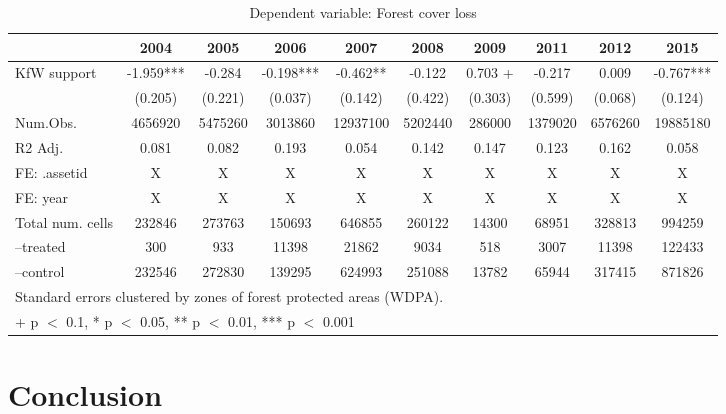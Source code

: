 \documentclass{article}
\begin{document}
\begin{table}[H]
\caption{Dependent variable: Forest cover loss}
\begin{minipage}{0.1\textwidth}

\centering
\begin{tabular}[t]{lccccccccc}
\toprule
  & 2004 & 2005 & 2006 & 2007 & 2008 & 2009 & 2011 & 2012 & 2015\\
\midrule
KfW support & -1.959*** & -0.284 & -0.198*** & -0.462** & -0.122 & 0.703 + & -0.217 & 0.009 & -0.767***\\
 & (0.205) & (0.221) & (0.037) & (0.142) & (0.422) & (0.303) & (0.599) & (0.068) & (0.124)\\
\midrule
Num.Obs. & 4656920 & 5475260 & 3013860 & 12937100 & 5202440 & 286000 & 1379020 & 6576260 & 19885180\\
R2 Adj. & 0.081 & 0.082 & 0.193 & 0.054 & 0.142 & 0.147 & 0.123 & 0.162 & 0.058\\
FE: .assetid & X & X & X & X & X & X & X & X & X\\
FE: year & X & X & X & X & X & X & X & X & X\\
Total num. cells & 232846 & 273763 & 150693 & 646855 & 260122 & 14300 & 68951 & 328813 & 994259\\
--treated & 300 & 933 & 11398 & 21862 & 9034 & 518 & 3007 & 11398 & 122433\\
--control & 232546 & 272830 & 139295 & 624993 & 251088 & 13782 & 65944 & 317415 & 871826\\
\bottomrule
\multicolumn{10}{l}{\rule{0pt}{1em}Standard errors clustered by zones of forest protected areas (WDPA).}\\
\multicolumn{10}{l}{\rule{0pt}{1em}+ p $<$ 0.1, * p $<$ 0.05, ** p $<$ 0.01, *** p $<$ 0.001}\\
\end{tabular}

\label{tab:Display results}
\end{minipage}
\end{table}


\section{Conclusion}




 

\end{document}

